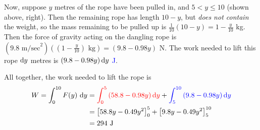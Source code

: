 \begin{solution}
\begin{description}
Now, suppose $y$ metres of the rope have been pulled in, and $5 < y \le 10$ (shown above, right). Then the remaining rope has length $10-y$, but \emph{does not contain} the weight, so the mass remaining to be pulled up is $\frac{1}{10}(10-y) = 1-\frac{y}{10}$ kg. Then the force of gravity acting on the dangling rope is $(9.8 \text{ m/sec}^2)((1-\frac{y}{10})\text{ kg}) =\left(9.8-0.98y\right)$ N. The work needed to lift this rope $\mathrm{d}y$ metres is \textcolor{blue}{$\left(9.8-0.98y\right)\mathrm{d}y$ J}.

All together, the work needed to lift the rope is
\begin{align*}
W = \int_0^{10} F(y)~\mathrm{d}y &= \textcolor{red}{\int_0^5 \left(58.8-0.98y\right)\mathrm{d}y} + \textcolor{blue}{\int_5^{10}\left(9.8-0.98y\right)\mathrm{d}y}\\
&=\left[58.8y - 0.49y^2\right]_0^{5} + \left[9.8 y - 0.49 y^2\right]_5^{10}\\
&=294 \text{ J}
\end{align*}
\end{description}
\end{solution}





